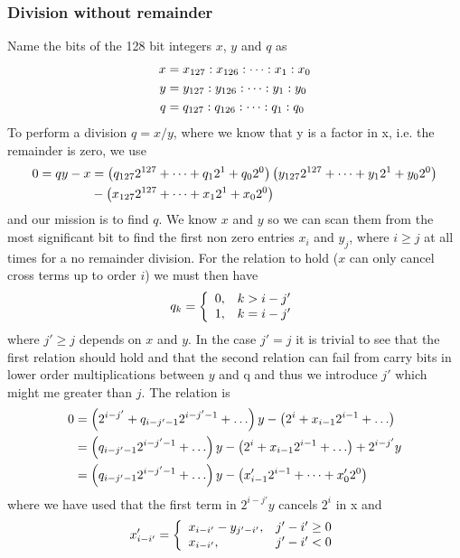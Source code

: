 \subsubsection{Division without remainder}
Name the bits of the 128 bit integers $x$, $y$ and $q$ as 
\begin{align}
x&=x_{127}:x_{126}:\dots:x_1:x_0\nonumber\\
y&=y_{127}:y_{126}:\dots:y_1:y_0\nonumber\\
q&=q_{127}:q_{126}:\dots:q_1:q_0
\end{align}
To perform a division $q=x/y$, where we know that y is a factor in x, i.e. the remainder is zero, we use
\begin{align}
0 = qy - x &= \lp q_{127}2^{127} + \dots + q_{1}2^{1} + q_{0}2^{0}\rp \lp y_{127}2^{127} + \dots + y_{1}2^{1} + y_{0}2^{0}\rp\nn\\
& - \lp x_{127}2^{127} + \dots + x_{1}2^{1} + x_{0}2^{0}\rp 
\eqnlab{int128_zerorem}
\end{align}
and our mission is to find $q$.
We know $x$ and $y$ so we can scan them from the most significant bit to find the first non zero entries $x_i$ and $y_j$, where $i\ge j$ at all times for a no remainder division.
For the relation to hold ($x$ can only cancel cross terms up to order $i$) we must then have
\begin{align}
q_{k} = \left\{\begin{array}{ll} 
0 , & k > i-j'\cr
1 , & k = i-j'
\end{array}\right. 
\end{align}
where $j'\ge j$ depends on $x$ and $y$. In the case $j'=j$ it is trivial to see that the first relation should hold and that the second relation can fail from carry bits in lower order multiplications between $y$ and q and thus we introduce $j'$ which might me greater than $j$. 
The relation  is
\begin{align}
0 &= \lp 2^{i-j'} + q_{i-j'-1}2^{i-j'-1} + \dots \rp y - \lp 2^{i} + x_{i-1}2^{i-1} + \dots \rp\nn\\ 
& = \lp q_{i-j'-1}2^{i-j'-1} + \dots \rp y - \lp 2^{i} + x_{i-1}2^{i-1} + \dots \rp + 2^{i-j'}y\nn\\ 
& = \lp q_{i-j'-1}2^{i-j'-1} + \dots \rp y - \lp x'_{i-1}2^{i-1} + \dots + x'_02^0 \rp 
\end{align}
where we have used that the first term in $2^{i-j'}y$ cancels $2^i$ in x and
\begin{align}
x'_{i-i'}=\left\{\begin{array}{ll}
x_{i-i'} - y_{j'-i'}, & j'-i' \ge 0\cr
x_{i-i'} , & j'-i' < 0\cr
\end{array}\right.
\end{align}
